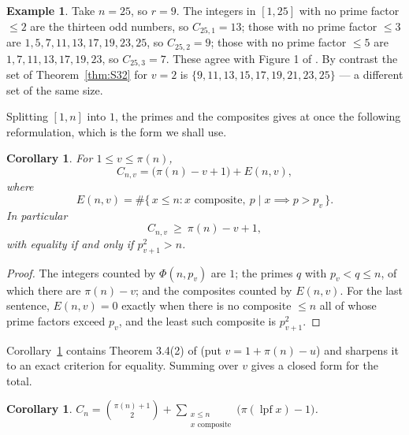 \documentclass[a4paper,11pt,oneside,reqno]{amsart}
\theoremstyle{definition}
\newtheorem{example}[definition]{Example}
\theoremstyle{remark}
\theoremstyle{plain}
\newtheorem{corollary}[definition]{Corollary}
\newcommand{\lpf}{\operatorname{lpf}}
\begin{document}
\begin{example}
  Take \(n = 25\), so \(r = 9\). The integers in \([1,25]\) with no prime factor
  \(\le 2\) are the thirteen odd numbers, so \(C_{25,1} = 13\); those with no
  prime factor \(\le 3\) are \(1,5,7,11,13,17,19,23,25\), so \(C_{25,2} = 9\);
  those with no prime factor \(\le 5\) are \(1,7,11,13,17,19,23\), so
  \(C_{25,3} = 7\). These agree with Figure 1 of \cite{Snellman2000}. By contrast
  the set of Theorem~\ref{thm:S32} for \(v = 2\) is
  \(\{9,11,13,15,17,19,21,23,25\}\) --- a different set of the same size.
\end{example}

Splitting \([1,n]\) into \(1\), the primes and the composites gives at once the
following reformulation, which is the form we shall use.

\begin{corollary}\label{cor:split}
  For \(1 \le v \le \pi(n)\),
  \begin{equation}\label{eq:split}
    C_{n,v} = \bigl(\pi(n)-v+1\bigr)+E(n,v),
  \end{equation}
  where
  \begin{equation}\label{eq:Edef}
    E(n,v) = \#\{\,x \le n :
      x \text{ composite},\ p \mid x \implies p > p_v\,\}.
  \end{equation}
  In particular
  \[
    C_{n,v}\ \ge \ \pi(n)-v+1,
  \]
  with equality if and only if \(p_{v+1}^{2} > n\).
\end{corollary}

\begin{proof}
  The integers counted by \(\Phi(n,p_v)\) are \(1\); the primes \(q\) with
  \(p_v < q \le n\), of which there are \(\pi(n)-v\); and the composites
  counted by \(E(n,v)\). For the last sentence, \(E(n,v) = 0\) exactly when there
  is no composite \(\le n\) all of whose prime factors exceed \(p_v\), and the
  least such composite is \(p_{v+1}^{2}\).
\end{proof}

Corollary~\ref{cor:split} contains Theorem 3.4(2) of \cite{Snellman2000} (put
\(v = 1+\pi(n)-u\)) and sharpens it to an exact criterion for equality. Summing over
\(v\) gives a closed form for the total.

\begin{corollary}\label{cor:total}
  \(\displaystyle
    C_n = \binom{\pi(n)+1}{2}+\sum_{\substack{x \le n\\ x\text{ composite}}}
        \bigl(\pi(\lpf x)-1\bigr)\).
\end{corollary}
\end{document}
